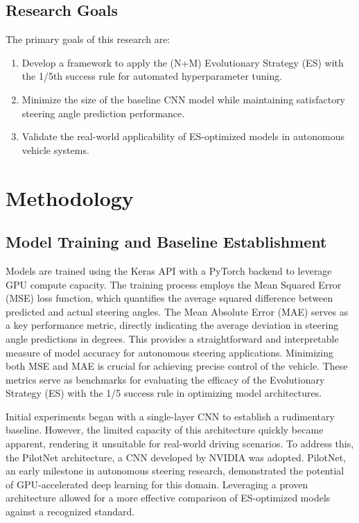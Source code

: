 \documentclass[conference]{IEEEtran}
\begin{document}
\subsection{Research Goals}

The primary goals of this research are:
\begin{enumerate}
    \item Develop a framework to apply the (N+M) Evolutionary Strategy (ES) with the 1/5th success rule for automated hyperparameter tuning.
    \item Minimize the size of the baseline CNN model while maintaining satisfactory steering angle prediction performance.
    \item Validate the real-world applicability of ES-optimized models in autonomous vehicle systems.
\end{enumerate}

\section{Methodology}

\subsection{Model Training and Baseline Establishment}

Models are trained using the Keras API with a PyTorch backend to leverage GPU compute capacity. The training process employs the Mean Squared Error (MSE) loss function, which quantifies the average squared difference between predicted and actual steering angles. The Mean Absolute Error (MAE) serves as a key performance metric, directly indicating the average deviation in steering angle predictions in degrees. This provides a straightforward and interpretable measure of model accuracy for autonomous steering applications. Minimizing both MSE and MAE is crucial for achieving precise control of the vehicle. These metrics serve as benchmarks for evaluating the efficacy of the Evolutionary Strategy (ES) with the 1/5 success rule in optimizing model architectures.

Initial experiments began with a single-layer CNN to establish a rudimentary baseline. However, the limited capacity of this architecture quickly became apparent, rendering it unsuitable for real-world driving scenarios. To address this, the PilotNet architecture, a CNN developed by NVIDIA \cite{PilotNET} was adopted. PilotNet, an early milestone in autonomous steering research, demonstrated the potential of GPU-accelerated deep learning for this domain. Leveraging a proven architecture allowed for a more effective comparison of ES-optimized models against a recognized standard.
\end{document}
